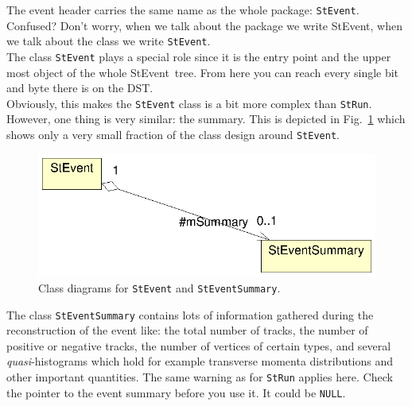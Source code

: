 \documentclass[twoside]{article}
\newcommand{\StEvent}{\textsf{StEvent}}
\begin{document}
The event header carries the same name as the whole package:
\texttt{StEvent}. Confused?  Don't worry, when we talk about the
package we write \StEvent, when we talk about the class we write
\texttt{StEvent}.\\
The class \texttt{StEvent} plays a special role since it is the entry
point and the upper most object of the whole \StEvent\ tree. From here
you
can reach every single bit and byte there is on the DST.\\
Obviously, this makes the \texttt{StEvent} class is a bit more complex
than \texttt{StRun}. However, one thing is very similar: the summary.
This is depicted in Fig.~\ref{fig:umlEvent} which shows only a very
small fraction of the class design around \texttt{StEvent}.
\begin{figure}[htb]
    \begin{center}
        \includegraphics{event.eps}
        \caption{Class diagrams for \texttt{StEvent} and
            \texttt{StEventSummary}.}
        \label{fig:umlEvent}
    \end{center}
\end{figure}
The class \texttt{StEventSummary} contains lots of information
gathered during the reconstruction of the event like: the total number
of tracks, the number of positive or negative tracks, the number of
vertices of certain types, and several \emph{quasi}-histograms which
hold for example transverse momenta distributions and other important
quantities. The same warning as for \texttt{StRun} applies here.
Check the pointer to the event summary before you use it. It could be
\texttt{NULL}.
 
\end{document}
